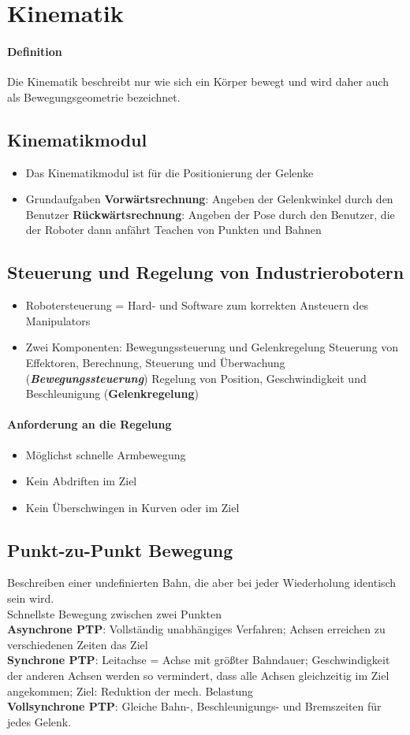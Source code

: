\section{Kinematik}
\paragraph{Definition}
Die Kinematik beschreibt nur wie sich ein Körper bewegt und wird daher auch als Bewegungsgeometrie bezeichnet.
\subsection{Kinematikmodul}
\begin{itemize}
	\item Das Kinematikmodul ist für die Positionierung der Gelenke
	\item Grundaufgaben
	\subitem \textbf{Vorwärtsrechnung}: Angeben der Gelenkwinkel durch den Benutzer
	\subitem \textbf{Rückwärtsrechnung}: Angeben der Pose durch den Benutzer, die der Roboter dann anfährt
	\subitem Teachen von Punkten und Bahnen
\end{itemize}
\subsection{Steuerung und Regelung von Industrierobotern}
\begin{itemize}
	\item Robotersteuerung = Hard- und Software zum korrekten Ansteuern des Manipulators
	\item Zwei Komponenten: Bewegungssteuerung und Gelenkregelung
	\subitem Steuerung von Effektoren, Berechnung, Steuerung und Überwachung (\textbf{\textit{Bewegungssteuerung}})
	\subitem Regelung von Position, Geschwindigkeit und Beschleunigung (\textbf{Gelenkregelung}) 
\end{itemize}
\paragraph{Anforderung an die Regelung}
\begin{itemize}
	\item Möglichst schnelle Armbewegung
	\item Kein Abdriften im Ziel
	\item Kein Überschwingen in Kurven oder im Ziel
\end{itemize}
\subsection{Punkt-zu-Punkt Bewegung}
Beschreiben einer undefinierten Bahn, die aber bei jeder Wiederholung identisch sein wird.\\
Schnellste Bewegung zwischen zwei Punkten\\
\textbf{Asynchrone PTP}: Vollständig unabhängiges Verfahren; Achsen erreichen zu verschiedenen Zeiten das Ziel\\
\textbf{Synchrone PTP}: Leitachse = Achse mit größter Bahndauer; Geschwindigkeit der anderen Achsen werden so vermindert, dass alle Achsen gleichzeitig im Ziel angekommen; Ziel: Reduktion der mech. Belastung\\
\textbf{Vollsynchrone PTP}: Gleiche Bahn-, Beschleunigungs- und Bremszeiten für jedes Gelenk.
